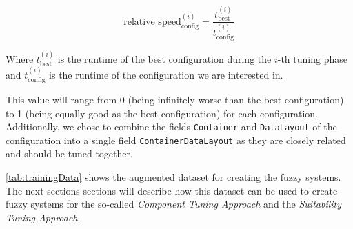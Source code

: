 \begin{equation}
    {\text{relative speed}^{(i)}_{\text{config}}}= \frac{t_{\text{best}}^{(i)}}{t_{\text{config}}^{(i)}}
\end{equation}

Where $t_{\text{best}}^{(i)}$ is the runtime of the best configuration during the $i$-th tuning phase and $t_{\text{config}}^{(i)}$ is the runtime of the configuration we are interested in.

This value will range from 0 (being infinitely worse than the best configuration) to 1 (being equally good as the best configuration) for each configuration. Additionally, we chose to combine the fields \texttt{Container} and \texttt{DataLayout} of the configuration into a single field \texttt{ContainerDataLayout} as they are closely related and should be tuned together.

\medskip

\autoref{tab:trainingData} shows the augmented dataset for creating the fuzzy systems. The next sections sections will describe how this dataset can be used to create fuzzy systems for the so-called \emph{Component Tuning Approach} and the \emph{Suitability Tuning Approach}.


